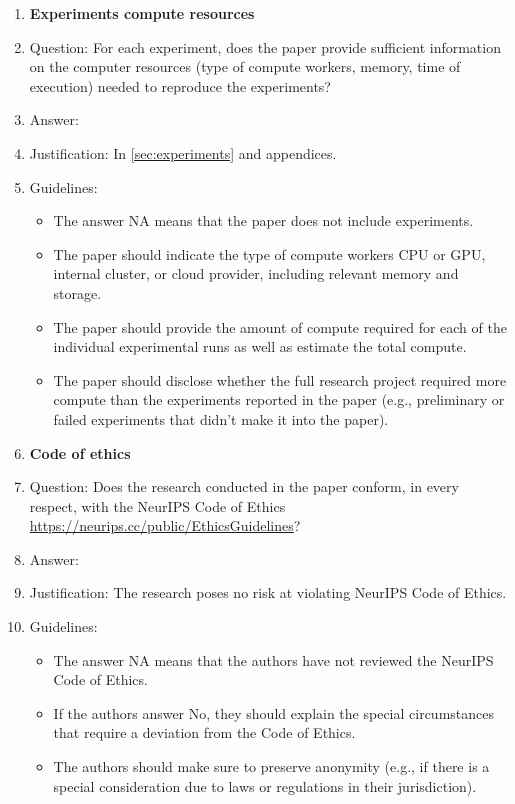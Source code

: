\documentclass{article}
\begin{document}
\begin{enumerate}
\item {\bf Experiments compute resources}
    \item[] Question: For each experiment, does the paper provide sufficient information on the computer resources (type of compute workers, memory, time of execution) needed to reproduce the experiments?
    \item[] Answer: \answerYes{} %
    \item[] Justification:  In \cref{sec:experiments} and appendices.
    \item[] Guidelines:
    \begin{itemize}
        \item The answer NA means that the paper does not include experiments.
        \item The paper should indicate the type of compute workers CPU or GPU, internal cluster, or cloud provider, including relevant memory and storage.
        \item The paper should provide the amount of compute required for each of the individual experimental runs as well as estimate the total compute. 
        \item The paper should disclose whether the full research project required more compute than the experiments reported in the paper (e.g., preliminary or failed experiments that didn't make it into the paper). 
    \end{itemize}
    
\item {\bf Code of ethics}
    \item[] Question: Does the research conducted in the paper conform, in every respect, with the NeurIPS Code of Ethics \url{https://neurips.cc/public/EthicsGuidelines}?
    \item[] Answer: \answerYes{} %
    \item[] Justification: The research poses no risk at violating NeurIPS Code of Ethics.
    \item[] Guidelines:
    \begin{itemize}
        \item The answer NA means that the authors have not reviewed the NeurIPS Code of Ethics.
        \item If the authors answer No, they should explain the special circumstances that require a deviation from the Code of Ethics.
        \item The authors should make sure to preserve anonymity (e.g., if there is a special consideration due to laws or regulations in their jurisdiction).
    \end{itemize}



\end{enumerate}
\end{document}
